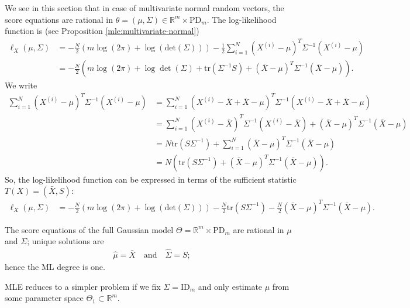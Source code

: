We see in this section that in case of multivariate normal random vectors, the score equations are rational in \( \theta = (\mu, \Sigma) \in \mathbb{R}^m \times \mathrm{PD}_m \). The log-likelihood function is (see Proposition \ref{mle:multivariate-normal}) 
\begin{align*}
  \ell_{X}( \mu, \Sigma) &= 
  -\frac{N}{2}   (m\log(2\pi) +  \log(\mathrm{det}(\Sigma))) -\frac{1}{2}\sum_{i=1}^N (X^{(i)} - \mu)^T \Sigma^{-1} (X^{(i)} - \mu) \\
  &= -\frac{N}{2}\left( m \log(2\pi) + \log\det(\Sigma) + \mathrm{tr}(\Sigma^{-1}S) + (\bar X - \mu)^T \Sigma^{-1}(\bar X - \mu) \right).
\end{align*}
We write 
\begin{align*}
  \sum_{i=1}^N (X^{(i)} - \mu)^T \Sigma^{-1} (X^{(i)} - \mu) 
  &= \sum_{i=1}^N (X^{(i)} - \bar X + \bar X - \mu)^T \Sigma^{-1} (X^{(i)} - \bar X + \bar X - \mu)\\
  &= \sum_{i=1}^N (X^{(i)} - \bar X)^T\Sigma^{-1}(X^{(i)} - \bar X) + (\bar X - \mu)^T \Sigma^{-1} (\bar X - \mu) \\
  &= N \mathrm{tr}(S \Sigma^{-1}) + \sum_{i=1}^N(\bar X - \mu)^T \Sigma^{-1} (\bar X - \mu) \\
  &= N \left(\mathrm{tr}(S \Sigma^{-1}) + (\bar X - \mu)^T \Sigma^{-1} (\bar X - \mu)\right).
\end{align*}
So, the log-likelihood function can be expressed in terms of the sufficient statistic \( T(X) = (\bar X, S) \):
\begin{align*}
  \ell_{X}( \mu, \Sigma) &= 
  -\frac{N}{2}   (m\log(2\pi) +  \log(\mathrm{det}(\Sigma))) -\frac{N}{2}\mathrm{tr}(S \Sigma^{-1}) - \frac{N}{2} (\bar X - \mu)^T \Sigma^{-1} (\bar X - \mu).
\end{align*}
\begin{mdframed}
\begin{cor}
  The score equations of the full Gaussian model \( \Theta = \mathbb{R}^m \times \mathrm{PD}_m \) are rational in \( \mu \) and \( \Sigma \); unique solutions are 
\begin{align*}
  \hat \mu = \bar X \quad \text{and} \quad \hat \Sigma = S;
\end{align*}
hence the ML degree is one.
\end{cor}
\end{mdframed}


MLE reduces to a simpler problem if we fix \( \Sigma = \mathrm{ID}_m \) and only estimate \( \mu \) from some parameter space \( \Theta_1 \subset \mathbb R^m \).

